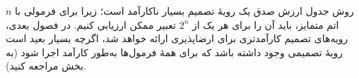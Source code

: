     روش جدول ارزش صدق یک رویهٔ تصمیم بسیار ناکارآمد است؛ زیرا برای فرمولی با \(n\) اتم متمایز، باید آن را برای هر یک از \(2^n\) تعبیر ممکن ارزیابی کنیم. در فصول بعدی، رویه‌های تصمیم کارآمدتری برای ارضاپذیری ارائه خواهد شد، اگرچه بسیار بعید است رویهٔ تصمیمی وجود داشته باشد که برای همهٔ فرمول‌ها به‌طور کارآمد اجرا شود (به بخش  مراجعه کنید).